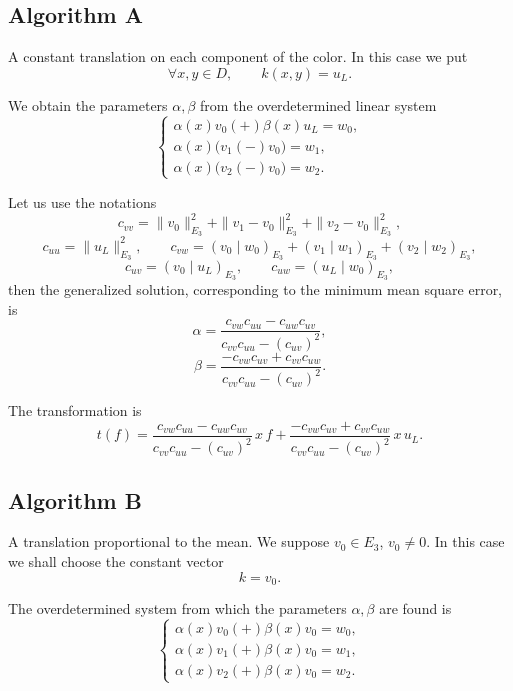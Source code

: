 \documentclass[11pt]{article}
\begin{document}
\subsection{Algorithm A}

A constant translation on each component of the color. In this case we put
\begin{equation}
\forall x,y\in D,\qquad k(x,y)=u_L.
\end{equation}

We obtain the parameters $\alpha,\beta$ from the overdetermined linear system
\begin{equation}
\begin{cases}
\alpha(x)v_0(+)\beta(x)u_L=w_0,\\
\alpha(x)\big(v_1(-)v_0\big)=w_1,\\
\alpha(x)\big(v_2(-)v_0\big)=w_2.
\end{cases}
\end{equation}

Let us use the notations
\[
c_{vv}=\|v_0\|_{E_3}^2+\|v_1-v_0\|_{E_3}^2+\|v_2-v_0\|_{E_3}^2,
\]
\[
c_{uu}=\|u_L\|_{E_3}^2,\qquad
c_{vw}=(v_0\mid w_0)_{E_3}+(v_1\mid w_1)_{E_3}+(v_2\mid w_2)_{E_3},
\]
\[
c_{uv}=(v_0\mid u_L)_{E_3},\qquad
c_{uw}=(u_L\mid w_0)_{E_3},
\]
then the generalized solution, corresponding to the minimum mean square error, is
\begin{equation}
\alpha=\frac{c_{vw}c_{uu}-c_{uw}c_{uv}}{c_{vv}c_{uu}-(c_{uv})^2},
\end{equation}
\begin{equation}
\beta=\frac{-c_{vw}c_{uv}+c_{vv}c_{uw}}{c_{vv}c_{uu}-(c_{uv})^2}.
\end{equation}

The transformation is
\begin{equation}
t(f)=
\frac{c_{vw}c_{uu}-c_{uw}c_{uv}}{c_{vv}c_{uu}-(c_{uv})^2}\,x\,f
+
\frac{-c_{vw}c_{uv}+c_{vv}c_{uw}}{c_{vv}c_{uu}-(c_{uv})^2}\,x\,u_L.
\end{equation}

\subsection{Algorithm B}

A translation proportional to the mean. We suppose $v_0\in E_3$, $v_0\neq 0$. In this case we shall choose the constant vector
\begin{equation}
k=v_0.
\end{equation}

The overdetermined system from which the parameters $\alpha,\beta$ are found is
\begin{equation}
\begin{cases}
\alpha(x)v_0(+)\beta(x)v_0=w_0,\\
\alpha(x)v_1(+)\beta(x)v_0=w_1,\\
\alpha(x)v_2(+)\beta(x)v_0=w_2.
\end{cases}
\end{equation}
\end{document}

